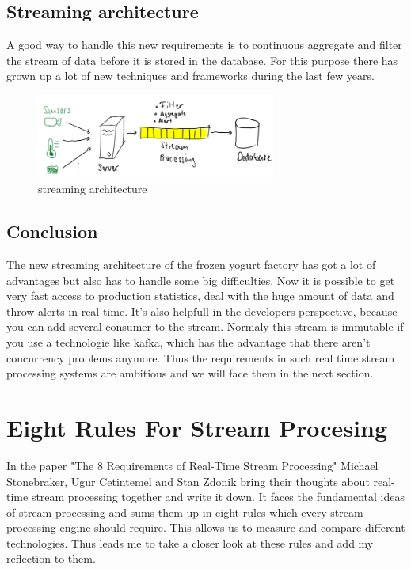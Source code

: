 \subsection{Streaming architecture}
A good way to handle this new requirements is to continuous aggregate and filter the stream of data before it is stored in the database.
For this purpose there has grown up a lot of new techniques and frameworks during the last few years.

\begin{figure}[H]
\centering
\captionsetup{justification=centering}
\includegraphics[width=0.7\textwidth]{images/stream.png}
\caption[streaming architecture]{streaming architecture}
\end{figure}

\newpage

\subsection{Conclusion}
The new streaming architecture of the frozen yogurt factory has got a lot of advantages but also has to handle some big difficulties.
Now it is possible to get very fast access to production statistics, deal with the huge amount of data and throw alerts in real time.
It's also helpfull in the developers perspective, because you can add several consumer to the stream.
Normaly this stream is immutable if you use a technologie like kafka, which has the advantage that there aren't concurrency problems anymore.
Thus the requirements in such real time stream processing systems are ambitious and we will face them in the next section.

\newpage

\section{Eight Rules For Stream Procesing}
In the paper "The 8 Requirements of Real-Time Stream Processing" Michael Stonebraker, Ugur Cetintemel and Stan Zdonik
bring their thoughts about real-time stream processing together and write it down. It faces the fundamental ideas of stream processing
and sums them up in eight rules which every stream processing engine should require.
This allows us to measure and compare different technologies.
Thus leads me to take a closer look at these rules and add my reflection to them.

